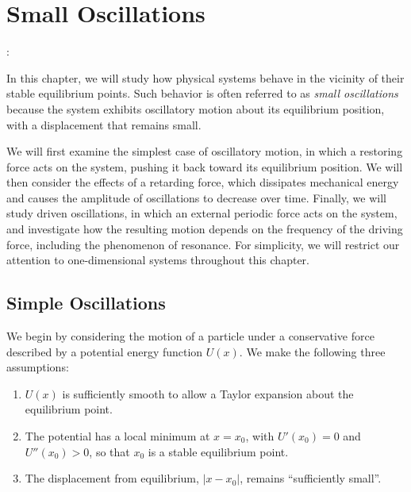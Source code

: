 \documentclass[../main.tex]{subfiles}
\begin{document}
\chapter{Small Oscillations}:
\maketitle
In this chapter, we will study how physical systems behave in the vicinity of their stable equilibrium points. Such behavior is often referred to as \textit{small oscillations} because the system exhibits oscillatory motion about its equilibrium position, with a displacement that remains small.

We will first examine the simplest case of oscillatory motion, in which a restoring force acts on the system, pushing it back toward its equilibrium position. We will then consider the effects of a retarding force, which dissipates mechanical energy and causes the amplitude of oscillations to decrease over time. Finally, we will study driven oscillations, in which an external periodic force acts on the system, and investigate how the resulting motion depends on the frequency of the driving force, including the phenomenon of resonance. For simplicity, we will restrict our attention to one-dimensional systems throughout this chapter.

\section{Simple Oscillations}

We begin by considering the motion of a particle under a conservative force described by a potential energy function $U(x)$. We make the following three assumptions:
\begin{enumerate}
    \item[(i)] $U(x)$ is sufficiently smooth to allow a Taylor expansion about the equilibrium point.
    \item[(ii)] The potential has a local minimum at $x=x_0$, with $U'(x_0)=0$ and $U''(x_0)>0$, so that $x_0$ is a stable equilibrium point.
    \item[(iii)] The displacement from equilibrium, $|x-x_0|$, remains ``sufficiently small''.
\end{enumerate}
\end{document}
